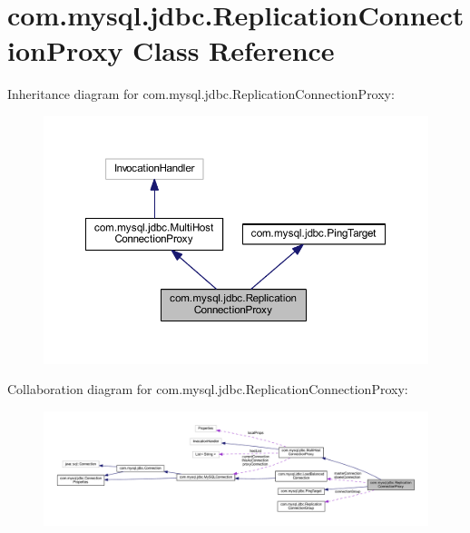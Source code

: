 \hypertarget{classcom_1_1mysql_1_1jdbc_1_1_replication_connection_proxy}{}\section{com.\+mysql.\+jdbc.\+Replication\+Connection\+Proxy Class Reference}
\label{classcom_1_1mysql_1_1jdbc_1_1_replication_connection_proxy}


Inheritance diagram for com.\+mysql.\+jdbc.\+Replication\+Connection\+Proxy\+:
\nopagebreak
\begin{figure}[H]
\begin{center}
\leavevmode
\includegraphics[width=350pt]{classcom_1_1mysql_1_1jdbc_1_1_replication_connection_proxy__inherit__graph}
\end{center}
\end{figure}


Collaboration diagram for com.\+mysql.\+jdbc.\+Replication\+Connection\+Proxy\+:
\nopagebreak
\begin{figure}[H]
\begin{center}
\leavevmode
\includegraphics[width=350pt]{classcom_1_1mysql_1_1jdbc_1_1_replication_connection_proxy__coll__graph}
\end{center}
\end{figure}
